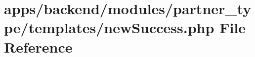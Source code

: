 \hypertarget{backend_2modules_2partner__type_2templates_2new_success_8php}{\section{apps/backend/modules/partner\-\_\-type/templates/new\-Success.php File Reference}
\label{backend_2modules_2partner__type_2templates_2new_success_8php}
}
